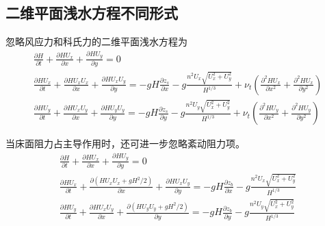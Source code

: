 \subsection{二维平面浅水方程不同形式}
忽略风应力和科氏力的二维平面浅水方程为
\begin{equation}
  \begin{gathered}
  \frac{\partial H}{\partial t} +
  \frac{\partial HU_{x}}{\partial x} +
  \frac{\partial HU_{y}}{\partial y}
  =
  0
    \\
  \frac{\partial HU_{x}}{\partial t} +
  \frac{\partial HU_{x}U_{x}}{\partial x} +
  \frac{\partial HU_{x}U_{y}}{\partial y} 
  =
  -gH\frac{\partial  z_{s}}{\partial x}
  -g\frac{n^{2}U_{x}\sqrt{U_{x}^{2}+U_{y}^{2}}}{H^{1/3}}
  +
  \nu_{t}\left(
    \frac{\partial^{2}HU_{x}}{\partial x^{2}}+
    \frac{\partial^{2}HU_{x}}{\partial y^{2}}
\right)
    \\
  \frac{\partial HU_{y}}{\partial t} +
  \frac{\partial HU_{x}U_{y}}{\partial x} +
  \frac{\partial HU_{y}U_{y}}{\partial y} 
  =
  -gH\frac{\partial  z_{s}}{\partial y}
  -g\frac{n^{2}U_{y}\sqrt{U_{x}^{2}+U_{y}^{2}}}{H^{1/3}}
  +
  \nu_{t}\left(
    \frac{\partial^{2}HU_{y}}{\partial x^{2}}+
    \frac{\partial^{2}HU_{y}}{\partial y^{2}}
\right)
  \end{gathered}
\end{equation}

当床面阻力占主导作用时，还可进一步忽略紊动阻力项。
\begin{equation}
  \begin{gathered}
  \frac{\partial H}{\partial t} +
  \frac{\partial HU_{x}}{\partial x} +
  \frac{\partial HU_{y}}{\partial y}
  =
  0
    \\
  \frac{\partial HU_{x}}{\partial t} +
  \frac{\partial (HU_{x}U_{x}+gH^{2}/2)}{\partial x} +
  \frac{\partial HU_{x}U_{y}}{\partial y} 
  =
  -gH\frac{\partial z_{b}}{\partial x}
  -g\frac{n^{2}U_{x}\sqrt{U_{x}^{2}+U_{y}^{2}}}{H^{1/3}}
    \\
  \frac{\partial HU_{y}}{\partial t} +
  \frac{\partial HU_{x}U_{y}}{\partial x} +
  \frac{\partial (HU_{y}U_{y}+gH^{2}/2)}{\partial y} 
  =
  -gH\frac{\partial z_{b}}{\partial y}
  -g\frac{n^{2}U_{y}\sqrt{U_{x}^{2}+U_{y}^{2}}}{H^{1/3}}
  \end{gathered}
\end{equation}

